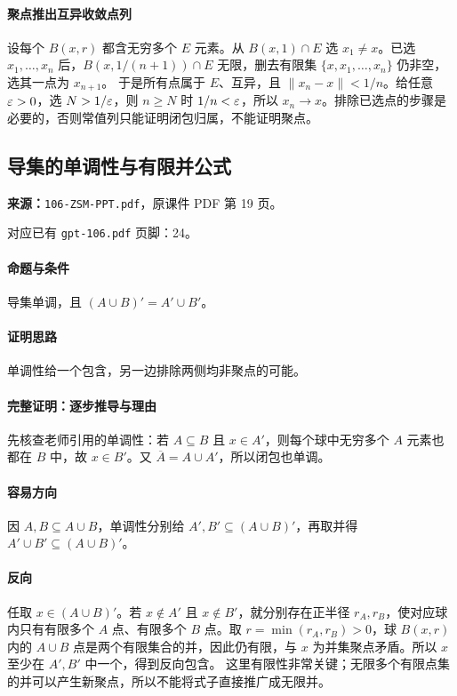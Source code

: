 \paragraph{聚点推出互异收敛点列}设每个 $B(x,r)$ 都含无穷多个 $E$ 元素。从 $B(x,1)\cap E$ 选 $x_1\ne x$。已选 $x_1,\ldots,x_n$ 后，$B(x,1/(n+1))\cap E$ 无限，删去有限集 $\{x,x_1,\ldots,x_n\}$ 仍非空，选其一点为 $x_{n+1}$。
于是所有点属于 $E$、互异，且 $\|x_n-x\|<1/n$。给任意 $\varepsilon>0$，选 $N>1/\varepsilon$，则 $n\ge N$ 时 $1/n<\varepsilon$，所以 $x_n\to x$。排除已选点的步骤是必要的，否则常值列只能证明闭包归属，不能证明聚点。

\clearpage\subsection{导集的单调性与有限并公式}
\textbf{来源：}\texttt{106-ZSM-PPT.pdf}，原课件 PDF 第 19 页。\par
对应已有 \texttt{gpt-106.pdf} 页脚：24。\par
\paragraph{命题与条件}导集单调，且 $(A\cup B)'=A'\cup B'$。
\paragraph{证明思路}单调性给一个包含，另一边排除两侧均非聚点的可能。
\paragraph{完整证明：逐步推导与理由}

先核查老师引用的单调性：若 $A\subseteq B$ 且 $x\in A'$，则每个球中无穷多个 $A$ 元素也都在 $B$ 中，故 $x\in B'$。又 $\overline A=A\cup A'$，所以闭包也单调。
\paragraph{容易方向}因 $A,B\subseteq A\cup B$，单调性分别给 $A',B'\subseteq(A\cup B)'$，再取并得 $A'\cup B'\subseteq(A\cup B)'$。
\paragraph{反向}任取 $x\in(A\cup B)'$。若 $x\notin A'$ 且 $x\notin B'$，就分别存在正半径 $r_A,r_B$，使对应球内只有有限多个 $A$ 点、有限多个 $B$ 点。取 $r=\min(r_A,r_B)>0$，球 $B(x,r)$ 内的 $A\cup B$ 点是两个有限集合的并，因此仍有限，与 $x$ 为并集聚点矛盾。所以 $x$ 至少在 $A',B'$ 中一个，得到反向包含。
这里有限性非常关键；无限多个有限点集的并可以产生新聚点，所以不能将式子直接推广成无限并。

